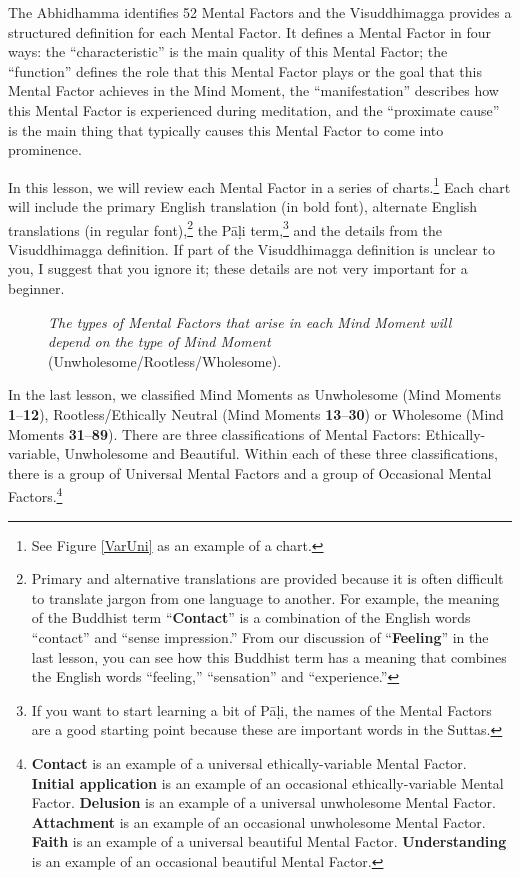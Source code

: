 The Abhidhamma identifies 52 Mental Factors and the Visuddhimagga provides a structured definition for each Mental Factor. It defines a Mental Factor in four ways: the “characteristic” is the main quality of this Mental Factor; the “function” defines the role that this Mental Factor plays or the goal that this Mental Factor achieves in the Mind Moment, the “manifestation” describes how this Mental Factor is experienced during meditation, and the “proximate cause” is the main thing that typically causes this Mental Factor to come into prominence.

In this lesson, we will review each Mental Factor in a series of charts.\footnote{See Figure \ref{VarUni} as an example of a chart.} Each chart will include the primary English translation (in bold font), alternate English translations (in regular font),\footnote{Primary and alternative translations are provided because it is often difficult to translate jargon from one language to another. For example, the meaning of the Buddhist term “\textbf{Contact}” is a combination of the English words “contact” and “sense impression.” From our discussion of “\textbf{Feeling}” in the last lesson, you can see how this Buddhist term has a meaning that combines the English words “feeling,” “sensation” and “experience.”} the Pāḷi term,\footnote{If you want to start learning a bit of Pāḷi, the names of the Mental Factors are a good starting point because these are important words in the Suttas.} and the details from the Visuddhimagga definition. If part of the Visuddhimagga definition is unclear  to you, I suggest that you ignore it; these details are not very important for a beginner.

\pagebreak

\begin{figure}[H]
\centering

\caption{{\small \textit{The types of Mental Factors that arise in each Mind Moment will depend on the type of Mind Moment }(Unwholesome/Rootless/Wholesome).}}
\label{fig:MentalFactors}
\end{figure}

In the last lesson, we classified Mind Moments as Unwholesome (Mind Moments \textbf{1}--\textbf{12}), Rootless/Ethically Neutral (Mind Moments \textbf{13}--\textbf{30}) or Wholesome (Mind Moments \textbf{31}--\textbf{89}). There are three classifications of Mental Factors: Ethically-variable, Unwholesome and Beautiful. Within each of these three classifications, there is a group of Universal Mental Factors and a group of Occasional Mental Factors.\footnote{\textbf{Contact} is an example of a universal ethically-variable Mental Factor. \textbf{Initial application} is an example of an occasional ethically-variable Mental Factor. \textbf{Delusion} is an example of a universal unwholesome Mental Factor. \textbf{Attachment} is an example of an occasional unwholesome Mental Factor. \textbf{Faith} is an example of a universal beautiful Mental Factor. \textbf{Understanding} is an example of an occasional beautiful Mental Factor.}

